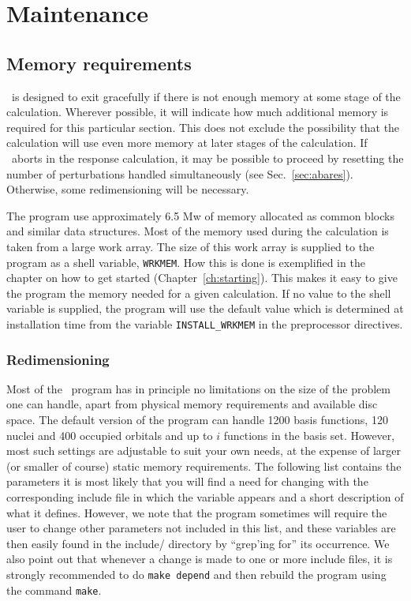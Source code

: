 \chapter{Maintenance}\label{ch:maintain}

\section{Memory requirements}

\dalton\ is designed to exit gracefully if there is not enough
memory at some stage of the calculation.  Wherever possible, it
will indicate how much additional memory is required for this
particular section.  This does not exclude the possibility that
the calculation will use even more memory at later stages of the
calculation. If \dalton\ aborts in the response calculation, it
may be possible to proceed by resetting the number of
perturbations handled simultaneously (see 
Sec.~\ref{sec:abares}).  Otherwise, some redimensioning will be
necessary.

The program use approximately 6.5 Mw of memory allocated as common
blocks and similar data structures. Most of the memory used during the
calculation is taken from a large work array. The size of this work
array is supplied to the program as a shell
variable, \verb|WRKMEM|.
How this is done is exemplified in the chapter on how to get started
(Chapter~\ref{ch:starting}). This makes it easy
to give the program the memory needed for a given calculation. If no
value to the shell 
variable is supplied, the program will use the default value which is
determined at installation time from the variable
\verb|INSTALL_WRKMEM| in the preprocessor
directives.

\subsection{Redimensioning \dalton}

Most of the \dalton\ program has in principle no limitations on
the size of the problem one can handle, apart from
physical memory requirements and available disc space. The default
version of the program can handle 1200 basis functions, 120 nuclei and
400 occupied orbitals and up to $i$ functions in the basis
set. However, most such settings are adjustable to suit your own
needs, at the expense of larger (or smaller of course) static memory
requirements. The following list contains the parameters it is
most likely that you will find a need for changing with the
corresponding include 
file in which the variable appears and a short description of what
it defines. However, we note that the program sometimes will
require the user to change other parameters not included in this
list, and these variables are then easily found in the include/
directory by ``grep'ing for'' its occurrence. We also point out that
whenever a change is made to one or more include files, it is strongly
recommended to do \verb|make depend| and then rebuild the program using the
command \verb|make|.

